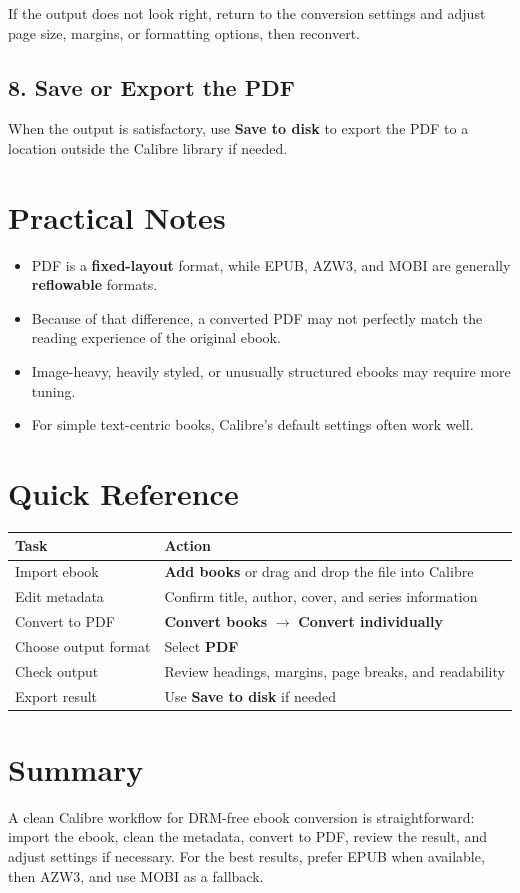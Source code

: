\documentclass[11pt]{article}
\begin{document}
\noindent If the output does not look right, return to the conversion settings and adjust page size, margins, or formatting options, then reconvert.

\subsection{8. Save or Export the PDF}

When the output is satisfactory, use \textbf{Save to disk} to export the PDF to a location outside the Calibre library if needed.

\section{Practical Notes}

\begin{itemize}
    \item PDF is a \textbf{fixed-layout} format, while EPUB, AZW3, and MOBI are generally \textbf{reflowable} formats.
    \item Because of that difference, a converted PDF may not perfectly match the reading experience of the original ebook.
    \item Image-heavy, heavily styled, or unusually structured ebooks may require more tuning.
    \item For simple text-centric books, Calibre's default settings often work well.
\end{itemize}

\section{Quick Reference}

\begin{center}
\begin{tabularx}{\textwidth}{>{\raggedright\arraybackslash}p{} X}
\toprule
\textbf{Task} & \textbf{Action} \\
\midrule
Import ebook & \textbf{Add books} or drag and drop the file into Calibre \\
Edit metadata & Confirm title, author, cover, and series information \\
Convert to PDF & \textbf{Convert books} $\rightarrow$ \textbf{Convert individually} \\
Choose output format & Select \textbf{PDF} \\
Check output & Review headings, margins, page breaks, and readability \\
Export result & Use \textbf{Save to disk} if needed \\
\bottomrule
\end{tabularx}
\end{center}

\section{Summary}

A clean Calibre workflow for DRM-free ebook conversion is straightforward: import the ebook, clean the metadata, convert to PDF, review the result, and adjust settings if necessary. For the best results, prefer EPUB when available, then AZW3, and use MOBI as a fallback.
\end{document}
